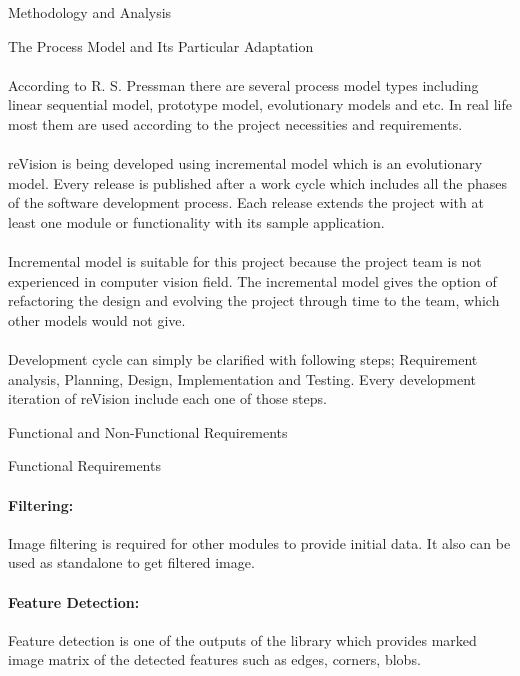 \documentclass[12pt, a4paper]{article} \pagenumbering{gobble}
\begin{document}
\begin{section}{Methodology and Analysis}
\begin{subsection}{The Process Model and Its Particular Adaptation}
    \paragraph{}{According to R. S. Pressman \cite{pressman} there are several process model types including linear sequential model, prototype model, evolutionary models and etc. In real life most them are used according to the project necessities and requirements.}
\paragraph{}{reVision is being developed using incremental model which is an evolutionary model. Every release is published after a work cycle which includes all the phases of the software development process. Each release extends the project with at least one module or functionality with its sample application.}
\paragraph{}{Incremental model is suitable for this project because the project team is not experienced in computer vision field. The incremental model gives the option of refactoring the design and evolving the project through time to the team, which other models would not give.}
\paragraph{}{Development cycle can simply be clarified with following steps; Requirement analysis, Planning, Design, Implementation and Testing. Every development iteration of reVision include each one of those steps.}
  \end{subsection}
  \newpage
  \begin{subsection}{Functional and Non-Functional Requirements}
    \begin{subsubsection}{Functional Requirements}
      \paragraph{Filtering:}{
      Image filtering is required for other modules to provide initial data. It also can be used as standalone to get filtered image.
      }
      \paragraph{Feature Detection:}{
      Feature detection is one of the outputs of the library which provides marked image matrix of the detected features such as edges, corners, blobs.
      }

\end{subsubsection}
\end{subsection}
\end{section}
\end{document}
